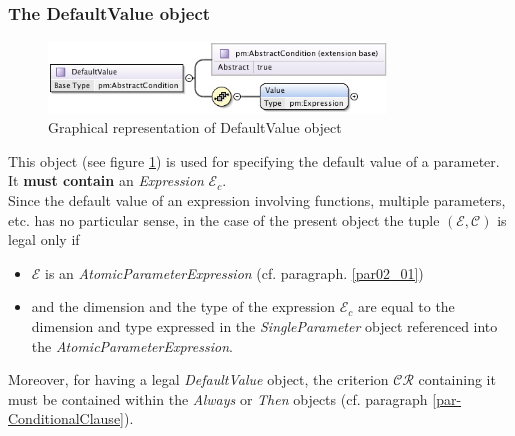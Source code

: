 \documentclass[a4paper,11pt] {ivoa}
\begin{document}
\subsubsection{The DefaultValue object}\label{par-DefaultValue}
\begin{figure}[htbp]
\begin{center}
\includegraphics[width=0.8\textwidth]{pictures/DefaultValue.jpg} 
\caption{Graphical representation of DefaultValue object}
\label{Pic-DefaultValue}
\end{center}
\end{figure}
This object (see figure \ref{Pic-DefaultValue}) is used for specifying the default value of a
parameter.\\
It {\bf must contain} an {\it Expression} $\mathcal E_c$.\\
Since the default value of an expression involving functions, multiple parameters, etc. has no
particular sense, in the case of the present object the tuple $(\mathcal E, \mathcal C)$  is legal
only if
\begin{itemize}
\item $\mathcal E$ is an {\it AtomicParameterExpression} (cf. paragraph. \ref{par02_01}) \item and
the dimension and the type of the expression $\mathcal E_c$ are equal to the dimension and type
expressed in the {\it SingleParameter} object referenced into the {\it AtomicParameterExpression}.
\end{itemize}
Moreover, for having a legal {\it DefaultValue} object, the criterion $\mathcal{CR}$ containing it must be contained within 
the {\it Always} or {\it Then}  objects (cf. paragraph \ref{par-ConditionalClause}).
\end{document}
